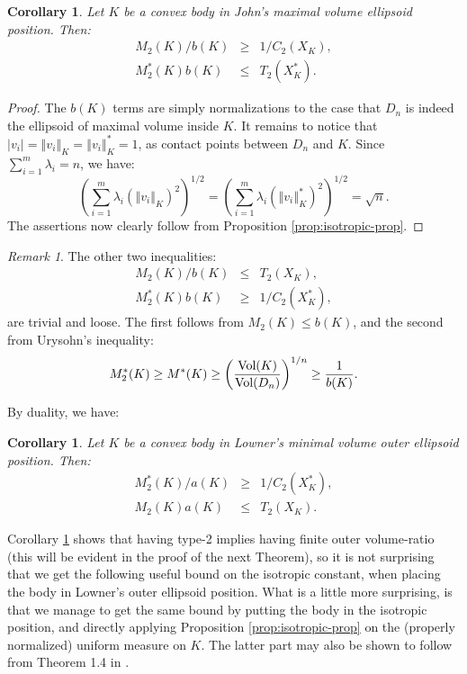 \documentclass[12pt,oneside]{amsart}
\newtheorem{cor}[thm]{Corollary}
\theoremstyle{definition}
\theoremstyle{remark}
\newtheorem{rem}[thm]{Remark}
\theoremstyle{proof}
\numberwithin{equation}{section}
\newcommand{\norm}[1]{\left\Vert#1\right\Vert}
\newcommand{\abs}[1]{\left\vert#1\right\vert}
\newcommand{\brac}[1]{\left(#1\right)}
\newcommand{\Vol}[1]{\textnormal{Vol} (#1)}
\newcommand{\VolRatio}[2]{\brac{\frac{\Vol{#1}}{\Vol{#2}}}^{1/n}}
\begin{document}
\begin{cor} \label{cor:2-inequalities}
Let $K$ be a convex body in John's maximal volume ellipsoid
position. Then:
\begin{eqnarray}
\nonumber M_2(K) / b(K) &\geq& 1 / C_2(X_K), \\
\nonumber M^*_2(K) b(K) &\leq& T_2(X^*_K).
\end{eqnarray}
\end{cor}
\begin{proof}
The $b(K)$ terms are simply normalizations to the case that $D_n$
is indeed the ellipsoid of maximal volume inside $K$. It remains
to notice that $\abs{v_i} = \norm{v_i}_K = \norm{v_i}^*_K = 1$,
as contact points between $D_n$ and $K$. Since $\sum_{i=1}^m
\lambda_i = n$, we have:
\[
\brac{\sum_{i=1}^m \lambda_i (\norm{v_i}_K)^2}^{1/2} =
\brac{\sum_{i=1}^m \lambda_i (\norm{v_i}^*_K)^2}^{1/2} = \sqrt{n}.
\]
The assertions now clearly follow from Proposition
\ref{prop:isotropic-prop}.
\end{proof}
\begin{rem}
The other two inequalities:
\begin{eqnarray}
\nonumber M_2(K) / b(K) &\leq& T_2(X_K), \\
\nonumber M^*_2(K) b(K) &\geq& 1/C_2(X^*_K),
\end{eqnarray}
are trivial and loose. The first follows from $M_2(K) \leq b(K)$,
and the second from Urysohn's inequality: \[M^*_2(K) \geq M^*(K)
\geq \VolRatio{K}{D_n} \geq \frac{1}{b(K)}.\]
\end{rem}

By duality, we have:
\begin{cor} \label{cor:2-inequalities-dual}
Let $K$ be a convex body in Lowner's minimal volume outer
ellipsoid position. Then:
\begin{eqnarray}
\nonumber M^*_2(K) / a(K) &\geq& 1 / C_2(X^*_K), \\
\nonumber M_2(K) a(K) &\leq& T_2(X_K).
\end{eqnarray}
\end{cor}

\medskip


Corollary \ref{cor:2-inequalities-dual} shows that having type-2
implies having finite outer volume-ratio (this will be evident in
the proof of the next Theorem), so it is not surprising that we
get the following useful bound on the isotropic constant, when
placing the body in Lowner's outer ellipsoid position. What is a
little more surprising, is that we manage to get the same bound by
putting the body in the isotropic position, and directly applying
Proposition \ref{prop:isotropic-prop} on the (properly
normalized) uniform measure on $K$. The latter part may also be
shown to follow from Theorem 1.4 in \cite{BMMP}.
\end{document}
